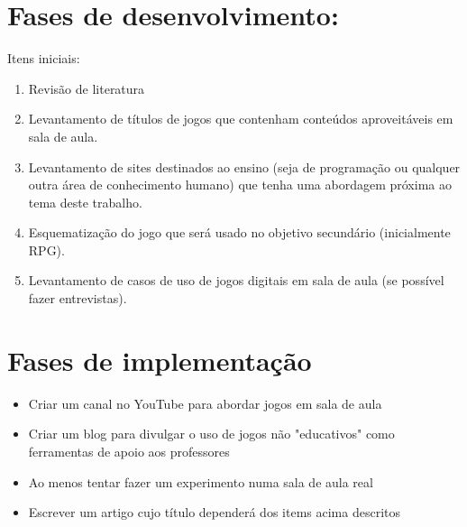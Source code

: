 \documentclass[10pt,a4paper]{article}
\begin{document}
	
	\section*{Fases de desenvolvimento:}
	Itens iniciais:
	
	\begin{enumerate}
		
		\item Revisão de literatura
		
		\item Levantamento de títulos de jogos que contenham conteúdos aproveitáveis em sala de aula.
		
		\item Levantamento de sites destinados ao ensino (seja de programação ou qualquer outra área de conhecimento humano) que tenha uma abordagem próxima ao tema deste trabalho.
		
		\item Esquematização do jogo que será usado no objetivo secundário (inicialmente RPG).
		
		\item Levantamento de casos de uso de jogos digitais em sala de aula (se possível fazer entrevistas).
		
	\end{enumerate}
	
	\section*{Fases de implementação}
	
	\begin{itemize}
		\item Criar um canal no YouTube para abordar jogos em sala de aula
		
		\item Criar um blog para divulgar o uso de jogos não "educativos" como ferramentas de apoio aos professores
		
		\item Ao menos tentar fazer um experimento numa sala de aula real
		
		\item Escrever um artigo cujo título dependerá dos items acima descritos
	\end{itemize}
	
\end{document}
